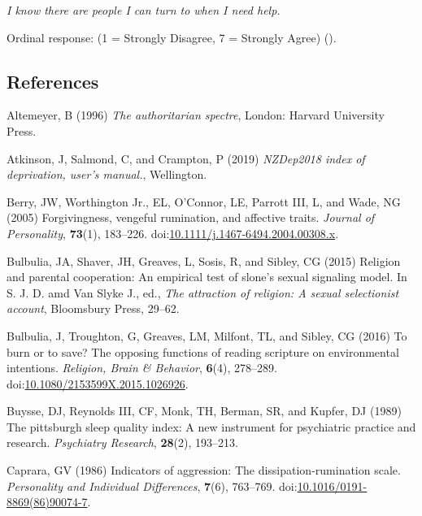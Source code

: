 \documentclass[
  single column]{article}
\newlength{\cslhangindent}
\newenvironment{CSLReferences}[2] %
 {\begin{list}{}{%
  \setlength{\itemindent}{0pt}
  \setlength{\leftmargin}{0pt}
  \setlength{\parsep}{0pt}
  \ifodd #1
   \setlength{\leftmargin}{\cslhangindent}
   \setlength{\itemindent}{-1\cslhangindent}
  \fi
  \setlength{\itemsep}{#2\baselineskip}}}
 {\end{list}}
\begin{document}
\emph{I know there are people I can turn to when I need help.}

Ordinal response: (1 = Strongly Disagree, 7 = Strongly Agree)
().

\newpage{}

\subsection*{References}\label{references}

\label{refs}
\begin{CSLReferences}{1}{0}
Altemeyer, B (1996) \emph{The authoritarian spectre}, London: Harvard
University Press.

Atkinson, J, Salmond, C, and Crampton, P (2019) \emph{NZDep2018 index of
deprivation, user{'}s manual.}, Wellington.

Berry, JW, Worthington Jr., EL, O'Connor, LE, Parrott III, L, and Wade,
NG (2005) Forgivingness, vengeful rumination, and affective traits.
\emph{Journal of Personality}, \textbf{73}(1), 183--226.
doi:\href{https://doi.org/10.1111/j.1467-6494.2004.00308.x}{10.1111/j.1467-6494.2004.00308.x}.

Bulbulia, JA, Shaver, JH, Greaves, L, Sosis, R, and Sibley, CG (2015)
Religion and parental cooperation: An empirical test of slone's sexual
signaling model. In S. J. D. amd Van Slyke J., ed., \emph{The attraction
of religion: A sexual selectionist account}, Bloomsbury Press, 29--62.

Bulbulia, J, Troughton, G, Greaves, LM, Milfont, TL, and Sibley, CG
(2016) To burn or to save? The opposing functions of reading scripture
on environmental intentions. \emph{Religion, Brain \& Behavior},
\textbf{6}(4), 278--289.
doi:\href{https://doi.org/10.1080/2153599X.2015.1026926}{10.1080/2153599X.2015.1026926}.

Buysse, DJ, Reynolds III, CF, Monk, TH, Berman, SR, and Kupfer, DJ
(1989) The pittsburgh sleep quality index: A new instrument for
psychiatric practice and research. \emph{Psychiatry Research},
\textbf{28}(2), 193--213.

Caprara, GV (1986) Indicators of aggression: The dissipation-rumination
scale. \emph{Personality and Individual Differences}, \textbf{7}(6),
763--769.
doi:\href{https://doi.org/10.1016/0191-8869(86)90074-7}{10.1016/0191-8869(86)90074-7}.


\end{CSLReferences}
\end{document}
